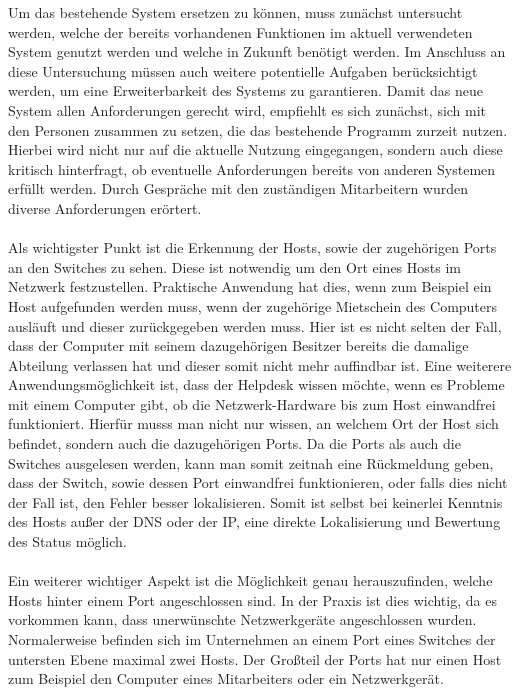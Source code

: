 Um das bestehende System ersetzen zu können, muss zunächst untersucht werden, welche der bereits vorhandenen Funktionen im aktuell verwendeten System genutzt werden und welche in Zukunft benötigt werden.
Im Anschluss an diese Untersuchung müssen auch weitere potentielle Aufgaben berücksichtigt werden, um eine Erweiterbarkeit des Systems zu garantieren.
Damit das neue System allen Anforderungen gerecht wird, empfiehlt es sich zunächst, sich mit den Personen zusammen zu setzen, die das bestehende Programm zurzeit nutzen.\\
Hierbei wird nicht nur auf die aktuelle Nutzung eingegangen, sondern auch diese kritisch hinterfragt, ob eventuelle Anforderungen bereits von anderen Systemen erfüllt werden.
Durch Gespräche mit den zuständigen Mitarbeitern wurden diverse Anforderungen erörtert.\\\\
Als wichtigster Punkt ist die Erkennung der Hosts, sowie der zugehörigen Ports an den Switches zu sehen.
Diese ist notwendig um den Ort eines Hosts im Netzwerk festzustellen. Praktische Anwendung hat dies, wenn zum Beispiel ein Host aufgefunden werden muss, wenn der zugehörige Mietschein des Computers ausläuft und dieser zurückgegeben werden muss.
Hier ist es nicht selten der Fall, dass der Computer mit seinem dazugehörigen Besitzer bereits die damalige Abteilung verlassen hat und dieser somit nicht mehr auffindbar ist.
Eine weiterere Anwendungsmöglichkeit ist, dass der Helpdesk wissen möchte, wenn es Probleme mit einem Computer gibt, ob die Netzwerk-Hardware bis zum Host einwandfrei funktioniert. Hierfür musss man nicht nur wissen, an welchem Ort der Host sich befindet, sondern auch die dazugehörigen Ports.
Da die Ports als auch die Switches ausgelesen werden, kann man somit zeitnah eine Rückmeldung geben, dass der Switch, sowie dessen Port einwandfrei funktionieren, oder falls dies nicht der Fall ist, den Fehler besser lokalisieren. Somit ist selbst bei keinerlei Kenntnis des Hosts außer der DNS oder der IP, eine direkte Lokalisierung und Bewertung des Status möglich.\\\\
Ein weiterer wichtiger Aspekt ist die Möglichkeit genau herauszufinden, welche Hosts hinter einem Port angeschlossen sind.
In der Praxis ist dies wichtig, da es vorkommen kann, dass unerwünschte Netzwerkgeräte angeschlossen wurden.
Normalerweise befinden sich im Unternehmen an einem Port eines Switches der untersten Ebene maximal zwei Hosts. Der Großteil der Ports hat nur einen Host zum Beispiel den Computer eines Mitarbeiters oder ein Netzwerkgerät.
